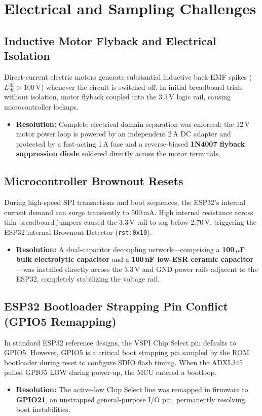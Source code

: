 \section{Electrical and Sampling Challenges}
\subsection{Inductive Motor Flyback and Electrical Isolation}
Direct-current electric motors generate substantial inductive back-EMF spikes ($L \frac{di}{dt} > 100$\,V) whenever the circuit is switched off. In initial breadboard trials without isolation, motor flyback coupled into the 3.3\,V logic rail, causing microcontroller lockups.
\begin{itemize}
    \item \textbf{Resolution:} Complete electrical domain separation was enforced: the 12\,V motor power loop is powered by an independent 2\,A DC adapter and protected by a fast-acting 1\,A fuse and a reverse-biased \textbf{1N4007 flyback suppression diode} soldered directly across the motor terminals.
\end{itemize}

\subsection{Microcontroller Brownout Resets}
During high-speed SPI transactions and boot sequences, the ESP32's internal current demand can surge transiently to 500\,mA. High internal resistance across thin breadboard jumpers caused the 3.3\,V rail to sag below 2.70\,V, triggering the ESP32 internal Brownout Detector (\texttt{rst:0x10}).
\begin{itemize}
    \item \textbf{Resolution:} A dual-capacitor decoupling network---comprising a \textbf{100\,$\mu$F bulk electrolytic capacitor} and a \textbf{100\,nF low-ESR ceramic capacitor}---was installed directly across the 3.3\,V and GND power rails adjacent to the ESP32, completely stabilizing the voltage rail.
\end{itemize}

\subsection{ESP32 Bootloader Strapping Pin Conflict (GPIO5 Remapping)}
In standard ESP32 reference designs, the VSPI Chip Select pin defaults to GPIO5. However, GPIO5 is a critical boot strapping pin sampled by the ROM bootloader during reset to configure SDIO flash timing. When the ADXL345 pulled GPIO5 LOW during power-up, the MCU entered a bootloop.
\begin{itemize}
    \item \textbf{Resolution:} The active-low Chip Select line was remapped in firmware to \textbf{GPIO21}, an unstrapped general-purpose I/O pin, permanently resolving boot instabilities.
\end{itemize}

